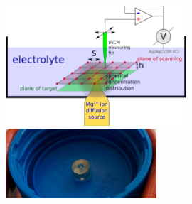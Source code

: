 \documentclass{beamer}
\begin{document}
\begin{frame}
\begin{figure}
\centering

\includegraphics[width=0.6\textwidth]{setup.eps} \vspace{1mm}


\includegraphics[width=0.5\textwidth]{pipette_source.jpg}
\end{figure}
\end{frame}
\end{document}

